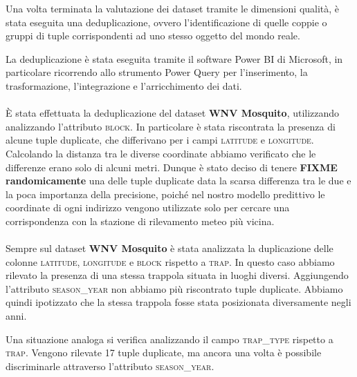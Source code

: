 Una volta terminata la valutazione dei dataset tramite le dimensioni qualità, è 
stata eseguita una deduplicazione, ovvero l'identificazione di quelle coppie 
o gruppi di tuple corrispondenti ad uno stesso oggetto del mondo reale.

La deduplicazione è stata eseguita tramite il software Power BI di Microsoft, 
in particolare ricorrendo allo strumento Power Query per l'inserimento, la 
trasformazione, l'integrazione e l'arricchimento dei dati.
\\\\	
È stata effettuata la deduplicazione del dataset \textbf{WNV Mosquito}, utilizzando analizzando l'attributo \textsc{block}. In particolare è stata riscontrata la presenza di alcune tuple duplicate, che differivano per i campi \textsc{latitude} e \textsc{longitude}. Calcolando la distanza tra le diverse coordinate abbiamo verificato che le differenze erano solo di alcuni metri.
Dunque è stato deciso di tenere \textbf{FIXME randomicamente} una delle tuple 
duplicate data la scarsa differenza tra le due e la poca importanza della 
precisione, poiché nel nostro modello predittivo le coordinate di ogni 
indirizzo vengono utilizzate solo per cercare una corrispondenza con la 
stazione di rilevamento meteo più vicina.
\\\\
Sempre sul dataset \textbf{WNV Mosquito} è stata analizzata la duplicazione 
delle colonne \textsc{latitude}, \textsc{longitude} e \textsc{block} rispetto a 
\textsc{trap}. In questo caso abbiamo rilevato la presenza di una stessa 
trappola situata in luoghi diversi. Aggiungendo l'attributo 
\textsc{season\_year} non abbiamo più riscontrato tuple duplicate. Abbiamo 
quindi ipotizzato che la stessa trappola fosse stata posizionata diversamente 
negli anni.

Una situazione analoga si verifica analizzando il campo \textsc{trap\_type} 
rispetto a \textsc{trap}. Vengono rilevate 17 tuple duplicate, ma ancora una 
volta è possibile discriminarle attraverso l'attributo \textsc{season\_year}.
